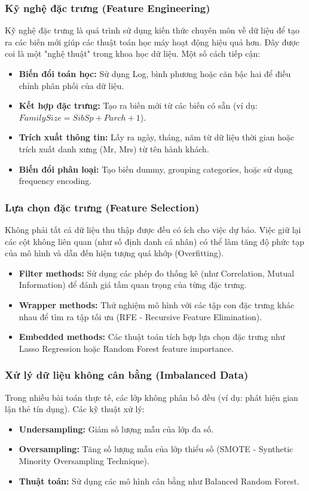 \subsubsection{Kỹ nghệ đặc trưng (Feature Engineering)}
Kỹ nghệ đặc trưng là quá trình sử dụng kiến thức chuyên môn về dữ liệu để tạo ra các biến mới giúp các thuật toán học máy hoạt động hiệu quả hơn. Đây được coi là một "nghệ thuật" trong khoa học dữ liệu. Một số cách tiếp cận:
\begin{itemize}
    \item \textbf{Biến đổi toán học:} Sử dụng Log, bình phương hoặc căn bậc hai để điều chỉnh phân phối của dữ liệu.
    \item \textbf{Kết hợp đặc trưng:} Tạo ra biến mới từ các biến có sẵn (ví dụ: $FamilySize = SibSp + Parch + 1$).
    \item \textbf{Trích xuất thông tin:} Lấy ra ngày, tháng, năm từ dữ liệu thời gian hoặc trích xuất danh xưng (Mr, Mrs) từ tên hành khách.
    \item \textbf{Biến đổi phân loại:} Tạo biến dummy, grouping categories, hoặc sử dụng frequency encoding.
\end{itemize}

\subsubsection{Lựa chọn đặc trưng (Feature Selection)}
Không phải tất cả dữ liệu thu thập được đều có ích cho việc dự báo. Việc giữ lại các cột không liên quan (như số định danh cá nhân) có thể làm tăng độ phức tạp của mô hình và dẫn đến hiện tượng quá khớp (Overfitting).
\begin{itemize}
    \item \textbf{Filter methods:} Sử dụng các phép đo thống kê (như Correlation, Mutual Information) để đánh giá tầm quan trọng của từng đặc trưng.
    \item \textbf{Wrapper methods:} Thử nghiệm mô hình với các tập con đặc trưng khác nhau để tìm ra tập tối ưu (RFE - Recursive Feature Elimination).
    \item \textbf{Embedded methods:} Các thuật toán tích hợp lựa chọn đặc trưng như Lasso Regression hoặc Random Forest feature importance.
\end{itemize}

\subsubsection{Xử lý dữ liệu không cân bằng (Imbalanced Data)}
Trong nhiều bài toán thực tế, các lớp không phân bố đều (ví dụ: phát hiện gian lận thẻ tín dụng). Các kỹ thuật xử lý:
\begin{itemize}
    \item \textbf{Undersampling:} Giảm số lượng mẫu của lớp đa số.
    \item \textbf{Oversampling:} Tăng số lượng mẫu của lớp thiểu số (SMOTE - Synthetic Minority Oversampling Technique).
    \item \textbf{Thuật toán:} Sử dụng các mô hình cân bằng như Balanced Random Forest.
\end{itemize}

